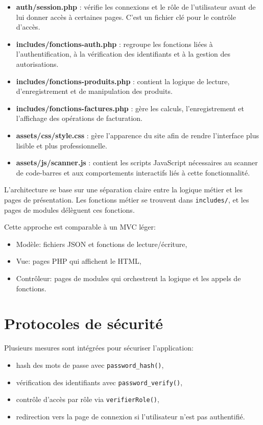 \documentclass[12pt,a4paper]{article}
\begin{document}
\begin{itemize}
  \item \textbf{auth/session.php} : vérifie les connexions et le rôle de l'utilisateur avant de lui donner accès à certaines pages. C'est un fichier clé pour le contrôle d'accès.
  \item \textbf{includes/fonctions-auth.php} : regroupe les fonctions liées à l'authentification, à la vérification des identifiants et à la gestion des autorisations.
  \item \textbf{includes/fonctions-produits.php} : contient la logique de lecture, d'enregistrement et de manipulation des produits.
  \item \textbf{includes/fonctions-factures.php} : gère les calculs, l'enregistrement et l'affichage des opérations de facturation.
  \item \textbf{assets/css/style.css} : gère l'apparence du site afin de rendre l'interface plus lisible et plus professionnelle.
  \item \textbf{assets/js/scanner.js} : contient les scripts JavaScript nécessaires au scanner de code-barres et aux comportements interactifs liés à cette fonctionnalité.
\end{itemize}
L'architecture se base sur une séparation claire entre la logique métier et les pages de présentation. Les fonctions métier se trouvent dans \texttt{includes/}, et les pages de modules délèguent ces fonctions.

Cette approche est comparable à un MVC léger:
\begin{itemize}
  \item Modèle: fichiers JSON et fonctions de lecture/écriture,
  \item Vue: pages PHP qui affichent le HTML,
  \item Contrôleur: pages de modules qui orchestrent la logique et les appels de fonctions.
\end{itemize}

\section{Protocoles de sécurité}
Plusieurs mesures sont intégrées pour sécuriser l'application:
\begin{itemize}
  \item hash des mots de passe avec \texttt{password\_hash()},
  \item vérification des identifiants avec \texttt{password\_verify()},
  \item contrôle d'accès par rôle via \texttt{verifierRole()},
  \item redirection vers la page de connexion si l'utilisateur n'est pas authentifié.
\end{itemize}
\end{document}

